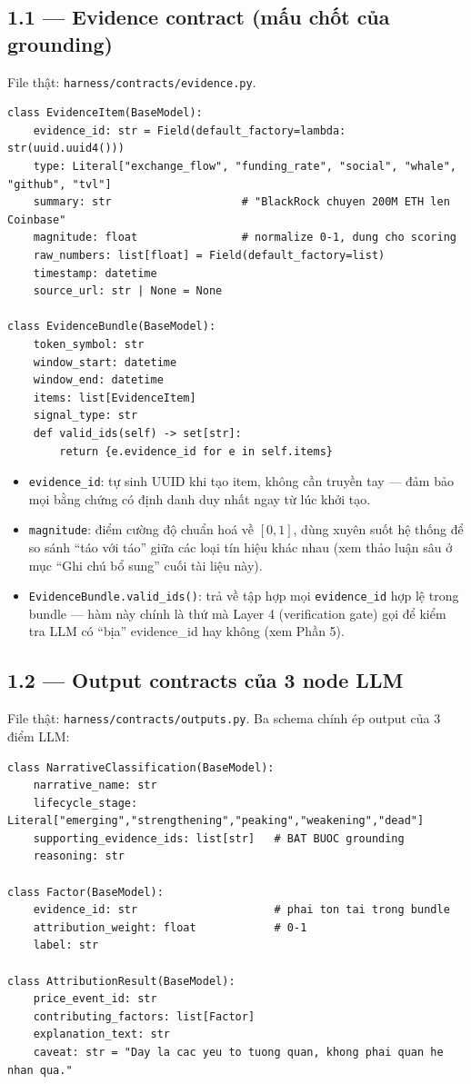 \documentclass[12pt,a4paper]{article}
\newcommand{\file}[1]{\texttt{#1}}
\begin{document}
\subsection{1.1 --- Evidence contract (mấu chốt của grounding)}

File thật: \file{harness/contracts/evidence.py}.

\begin{lstlisting}
class EvidenceItem(BaseModel):
    evidence_id: str = Field(default_factory=lambda: str(uuid.uuid4()))
    type: Literal["exchange_flow", "funding_rate", "social", "whale", "github", "tvl"]
    summary: str                    # "BlackRock chuyen 200M ETH len Coinbase"
    magnitude: float                # normalize 0-1, dung cho scoring
    raw_numbers: list[float] = Field(default_factory=list)
    timestamp: datetime
    source_url: str | None = None

class EvidenceBundle(BaseModel):
    token_symbol: str
    window_start: datetime
    window_end: datetime
    items: list[EvidenceItem]
    signal_type: str
    def valid_ids(self) -> set[str]:
        return {e.evidence_id for e in self.items}
\end{lstlisting}

\begin{itemize}[leftmargin=1.4em]
    \item \texttt{evidence\_id}: tự sinh UUID khi tạo item, không cần truyền tay --- đảm bảo mọi
    bằng chứng có định danh duy nhất ngay từ lúc khởi tạo.
    \item \texttt{magnitude}: điểm cường độ chuẩn hoá về $[0,1]$, dùng xuyên suốt hệ thống để so
    sánh ``táo với táo'' giữa các loại tín hiệu khác nhau (xem thảo luận sâu ở mục ``Ghi chú bổ
    sung'' cuối tài liệu này).
    \item \texttt{EvidenceBundle.valid\_ids()}: trả về tập hợp mọi \texttt{evidence\_id} hợp lệ
    trong bundle --- hàm này chính là thứ mà Layer 4 (verification gate) gọi để kiểm tra LLM có
    ``bịa'' evidence\_id hay không (xem Phần 5).
\end{itemize}

\subsection{1.2 --- Output contracts của 3 node LLM}

File thật: \file{harness/contracts/outputs.py}. Ba schema chính ép output của 3 điểm LLM:

\begin{lstlisting}
class NarrativeClassification(BaseModel):
    narrative_name: str
    lifecycle_stage: Literal["emerging","strengthening","peaking","weakening","dead"]
    supporting_evidence_ids: list[str]   # BAT BUOC grounding
    reasoning: str

class Factor(BaseModel):
    evidence_id: str                     # phai ton tai trong bundle
    attribution_weight: float            # 0-1
    label: str

class AttributionResult(BaseModel):
    price_event_id: str
    contributing_factors: list[Factor]
    explanation_text: str
    caveat: str = "Day la cac yeu to tuong quan, khong phai quan he nhan qua."
\end{lstlisting}
\end{document}
